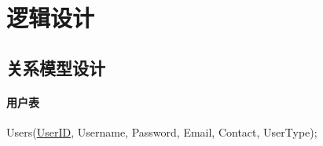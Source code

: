\section{逻辑设计}

\subsection{关系模型设计}

\paragraph{用户表}

Users(\underline{UserID}, Username, Password, Email, Contact, UserType);
